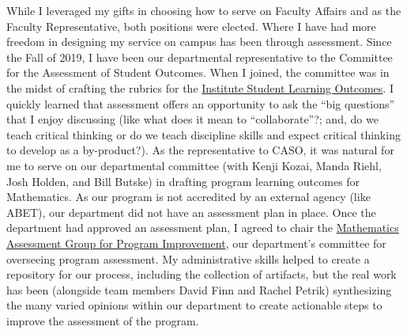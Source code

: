\documentclass[
  letterpaper,
  DIV=11,
  numbers=noendperiod]{scrreprt}
\begin{document}
While I leveraged my gifts in choosing how to serve on Faculty Affairs
and as the Faculty Representative, both positions were elected. Where I
have had more freedom in designing my service on campus has been through
assessment. Since the Fall of 2019, I have been our departmental
representative to the Committee for the Assessment of Student Outcomes.
When I joined, the committee was in the midst of crafting the rubrics
for the
\href{https://rosehulman-my.sharepoint.com/personal/trachten_rose-hulman_edu/_layouts/15/onedrive.aspx?id=\%2Fpersonal\%2Ftrachten_rose-hulman_edu\%2FDocuments\%2FShared\%20with\%20everyone\%2FResources\%20for\%20faculty\%20and\%20staff\%2FInstitute\%20Student\%20Learning\%20Outcomes\%2F2020-21\%20CASO\%20Rubrics\%2Epdf&parent=\%2Fpersonal\%2Ftrachten_rose-hulman_edu\%2FDocuments\%2FShared\%20with\%20everyone\%2FResources\%20for\%20faculty\%20and\%20staff\%2FInstitute\%20Student\%20Learning\%20Outcomes&originalPath=aHR0cHM6Ly9yb3NlaHVsbWFuLW15LnNoYXJlcG9pbnQuY29tLzpiOi9nL3BlcnNvbmFsL3RyYWNodGVuX3Jvc2UtaHVsbWFuX2VkdS9FY3lqN19yREVQaEhuakFoR0ZyZ0Z2SUJpRmpyT0dmVmxIUTZfaC1NbGVJRXdRP3J0aW1lPWE1MmpfTy1VMlVn}{Institute
Student Learning Outcomes}. I quickly learned that assessment offers an
opportunity to ask the ``big questions'' that I enjoy discussing (like
what does it mean to ``collaborate''?; and, do we teach critical
thinking or do we teach discipline skills and expect critical thinking
to develop as a by-product?). As the representative to CASO, it was
natural for me to serve on our departmental committee (with Kenji Kozai,
Manda Riehl, Josh Holden, and Bill Butske) in drafting program learning
outcomes for Mathematics. As our program is not accredited by an
external agency (like ABET), our department did not have an assessment
plan in place. Once the department had approved an assessment plan, I
agreed to chair the
\href{https://moodle.rose-hulman.edu/course/view.php?id=83104}{Mathematics
Assessment Group for Program Improvement}, our department's committee
for overseeing program assessment. My administrative skills helped to
create a repository for our process, including the collection of
artifacts, but the real work has been (alongside team members David Finn
and Rachel Petrik) synthesizing the many varied opinions within our
department to create actionable steps to improve the assessment of the
program.
\end{document}
